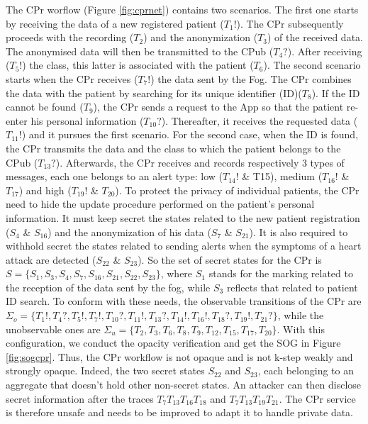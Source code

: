 The CPr worflow (Figure \ref{fig:cprnet}) contains two scenarios. The first one starts by receiving the data of a new registered patient ($T_1!$). The CPr subsequently proceeds with the recording ($T_2$) and the anonymization ($T_3$) of the received data. The anonymised data will then be transmitted to the CPub ($T_4?$). After receiving ($T_5!$) the class, this latter is associated with the patient ($T_6$). The second scenario starts when the CPr receives ($T_7!$) the data sent by the Fog. The CPr combines the data with the patient by searching for its unique identifier (ID)($T_8$). If the ID cannot be found ($T_9$), the CPr sends a request to the App so that the patient re-enter his personal information ($T_{10}?$). Thereafter, it receives the requested data ($T_{11}!$) and it  pursues the first scenario. For the second case, when the ID is found, the CPr transmits the data and the class to which the patient belongs to the CPub ($T_{13}?$). Afterwards, the CPr receives and records respectively 3 types of messages, each one belongs to an alert type: low ($T_{14}!$ \& T15), medium ($T_{16}!$ \& $T_{17}$) and high ($T_{19}!$ \& $T_{20}$). To protect the privacy of individual patients, the CPr need to hide the update procedure performed on the patient's personal information. It must keep secret the states related to the new patient registration ($S_4$ \& $S_{16}$) and the anonymization of his data ($S_7$ \& $S_{21}$). It is also required to withhold secret the states related to sending alerts when the symptoms of a heart attack are detected ($S_{22}$ \& $S_{23}$). So the set of secret states for the CPr is $S=\{S_1,S_3,S_4,S_7,S_16,S_{21},S_{22},S_{23}\}$, where $S_1$ stands for the marking related to the reception of the data sent by the fog, while $S_3$ reflects that related to patient ID search. To conform with these needs, the observable transitions of the CPr are $\Sigma_{o}=\{T_1!,T_4?,T_5!,T_7!,T_{10}?,T_{11}!,T_{13}?,T_{14}!,T_{16}!,T_{18}?,T_{19}!,T_{21}?\}$, while the unobservable ones are $\Sigma_{u}=\{T_2,T_3,T_6,T_8,T_9,T_{12},T_{15},T_{17},T_{20}\}$. With this configuration, we conduct the opacity verification and get the SOG in Figure \ref{fig:sogcpr}. Thus, the CPr workflow is not opaque and is not k-step weakly and strongly opaque. Indeed, the two secret states $S_{22}$ and $S_{23}$, each belonging to an aggregate that doesn't hold other non-secret states. An attacker can then disclose secret information after the traces $T_7T_{13}T_{16}T_{18}$ and $T_7T_{13}T_{19}T_{21}$. The CPr service is therefore unsafe and needs to be improved to adapt it to handle private data.
